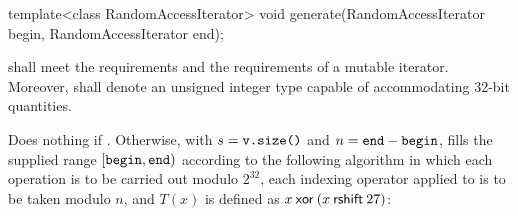 %
\begin{itemdecl}
template<class RandomAccessIterator>
  void generate(RandomAccessIterator begin, RandomAccessIterator end);
\end{itemdecl}

\begin{itemdescr}
\pnum\requires {}
  shall meet the
   requirements
  and the requirements of a mutable iterator.
  Moreover,
  shall denote an unsigned integer type
  capable of accommodating 32-bit quantities.

\pnum\effects
 Does nothing if .
 Otherwise,
 with $s = \texttt{v.size()}$
 and  $n = \texttt{end} - \texttt{begin}$,
 fills the supplied range $[\texttt{begin},\texttt{end})$
 according to the following algorithm
 in which
 each operation is to be carried out modulo $2^{32}$,
 each indexing operator applied to  is to be taken modulo $n$,
 and $T(x)$ is defined as $x \mathbin{\mathsf{xor}} (x \mathbin{\mathsf{rshift}} 27)$:


\end{itemdescr}
